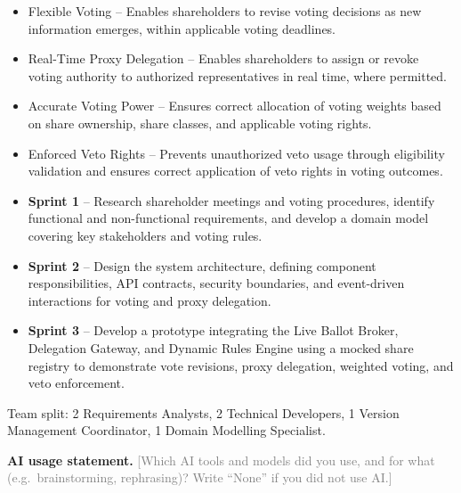 \documentclass[11pt,a4paper]{article}
\newcommand{\todo}[1]{\textcolor{gray}{[#1]}}
\newcommand{\pibapart}[1]{\vspace{0.4em}{\large\textbf{#1}}\par}
\begin{document}
\pibapart{Benefits}
\begin{itemize}
  \item Flexible Voting -- Enables shareholders to revise voting decisions as new information emerges, within applicable voting deadlines.
  \item Real-Time Proxy Delegation -- Enables shareholders to assign or revoke voting authority to authorized representatives in real time, where permitted.
  \item Accurate Voting Power -- Ensures correct allocation of voting weights based on share ownership, share classes, and applicable voting rights.
  \item Enforced Veto Rights -- Prevents unauthorized veto usage through eligibility validation and ensures correct application of veto rights in voting outcomes.
\end{itemize}

\pibapart{Action}
\begin{itemize}
  \item \textbf{Sprint 1} -- Research shareholder meetings and voting procedures, identify functional and non-functional requirements, and develop a domain model covering key stakeholders and voting rules.
  \item \textbf{Sprint 2} -- Design the system architecture, defining component responsibilities, API contracts, security boundaries, and event-driven interactions for voting and proxy delegation.
  \item \textbf{Sprint 3} -- Develop a prototype integrating the Live Ballot Broker, Delegation Gateway, and Dynamic Rules Engine using a mocked share registry to demonstrate vote revisions, proxy delegation, weighted voting, and veto enforcement.
\end{itemize}
Team split: 2 Requirements Analysts, 2 Technical Developers, 1 Version Management Coordinator, 1 Domain Modelling Specialist.


\vfill
{\small\textbf{AI usage statement.} \todo{Which AI tools and models did you
use, and for what (e.g.\ brainstorming, rephrasing)? Write ``None'' if you
did not use AI.}}
\end{document}
